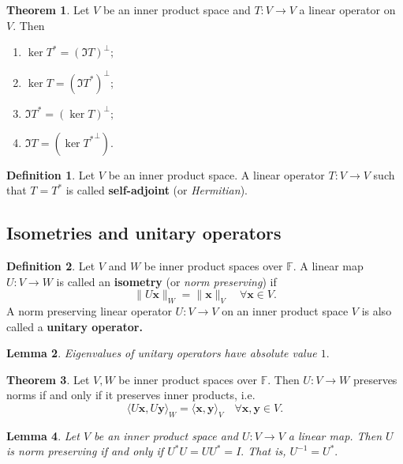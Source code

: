 \documentclass[12pt, a4paper]{article}
\newcommand{\bb}[1]{\mathbb{#1}}
\newcommand{\mb}[1]{\mathbf{#1}}
\theoremstyle{definition}
\newtheorem{definition}{Definition}[section]
\newtheorem{theorem}{Theorem}[section]
\theoremstyle{plain}
\newtheorem{lemma}[theorem]{Lemma}
\begin{document}
\begin{theorem}
Let $V$ be an inner product space and $T : V \to V$ a linear operator on $V.$ Then \begin{enumerate}
	
	\item $\ker{T^*}=(\Im T)^{\perp};$
	\item $\ker{T}=(\Im T^*)^{\perp};$
	\item $\Im T^*=(\ker{T})^{\perp};$
	\item $\Im T=(\ker{T^*}^\perp).$

\end{enumerate}
\end{theorem}

\begin{definition}
Let $V$ be an inner product space. A linear operator $T : V \to V$ such that $T = T^*$ is called \textbf{self-adjoint} (or \textit{Hermitian}).
\end{definition}

\subsection{Isometries and unitary operators}

\begin{definition}
 Let $V$ and $W$ be inner product spaces over $\bb{F}$. A linear map $U : V \to W$ is called an \textbf{isometry} (or \textit{norm preserving}) if $$\|U\mb{x}\|_W=\|\mb{x}\|_V \quad \forall\mb{x} \in V.$$ A norm preserving linear operator $U : V \to V$ on an inner product space $V$ is also called a \textbf{unitary operator.}
\end{definition}

\begin{lemma}
Eigenvalues of unitary operators have absolute value $1.$
\end{lemma}

\begin{theorem}
Let $V, W$ be inner product spaces over $\bb{F}.$ Then $U : V \to W$ preserves norms if and only if it preserves inner products, i.e. $$\langle U\mb{x},U\mb{y} \rangle_W=\langle \mb{x,y} \rangle_V \quad \forall\mb{x,y} \in V.$$
\end{theorem}

\begin{lemma}
Let $V$ be an inner product space and $U : V \to V$ a linear map. Then $U$ is norm preserving if and only if $U^*U = UU^* = I.$ That is, $U^{-1}=U^*.$
\end{lemma}
\end{document}
